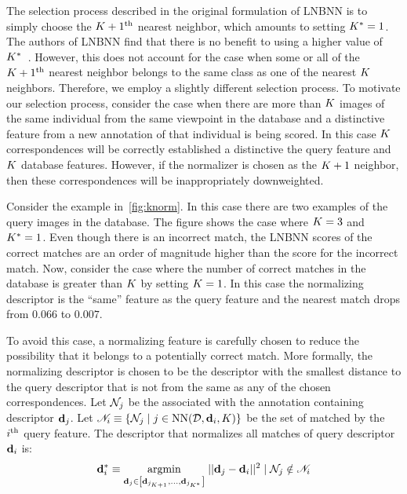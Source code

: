             The selection process described in the original formulation of LNBNN is to simply choose the %
            $K + 1^{\textrm{th}}{}$ nearest neighbor, which amounts to setting $K^{*}=1$. The authors of LNBNN find that there is
            no benefit to using a higher value of $K^{*}$~\cite{mccann_local_2012}. However, this does not account
            for the case when some or all of the $K + 1^{\textrm{th}}{}$ nearest neighbor belongs to the same class as one of
            the nearest $K$ neighbors. Therefore, we employ a slightly different selection process. To motivate
            our selection process, consider the case when there are more than $K$ images of the same individual
            from the same viewpoint in the database and a distinctive feature from a new annotation of that
            individual is being scored. In this case $K$ correspondences will be correctly established a
            distinctive the query feature and $K$ database features. However, if the normalizer is chosen as the
            $K + 1$ neighbor, then these correspondences will be inappropriately downweighted.
              
            Consider the example in~\cref{fig:knorm}. In this case there are two examples
             of the query images in the database. The figure shows the case where
            $K=3$ and $K^{*}=1$. Even though there is an incorrect match, the LNBNN scores of the correct matches
            are an order of magnitude higher than the score for the incorrect match. Now, consider the case where
            the number of correct matches in the database is greater than $K$ by setting $K=1$. In this case the
            normalizing descriptor is the ``same'' feature as the query feature and the nearest match drops from
            $0.066$ to $0.007$.

            \knorm{}

            To avoid this case, a normalizing feature is carefully chosen to reduce the possibility that it belongs
            to a potentially correct match. More formally, the normalizing descriptor is chosen to be the
            descriptor with the smallest distance to the query descriptor that is not from the same \name{} as any
            of the chosen correspondences. Let $\mathcal{N}_j$ be the \name{} associated with the annotation containing
            descriptor $\mathbf{d}_j$. Let %
            $\mathscr{N}_i \equiv \left\{\mathcal{N}_j \mid j \in \operatorname{NN}(\mathcal{D}, \mathbf{d}_i, K)\right\}$
            be the set of \names{} matched by the $i^{\textrm{th}}{}$ query feature. The descriptor that normalizes all
            matches of query descriptor $\mathbf{d}_i$ is:
              \begin{equation}
                  \mathbf{d}^{*}_{i} \equiv 
                  \underset{\mathbf{d}_j \in \left[\mathbf{d}_{{j_{K + 1}}}, \ldots{}, \mathbf{d}_{j_{K^{*}}}\right]}{\operatorname{argmin}}\;
                  ||\mathbf{d}_j - \mathbf{d}_i||^2 \mid \mathcal{N}_j \notin \mathscr{N}_i
              \end{equation}

